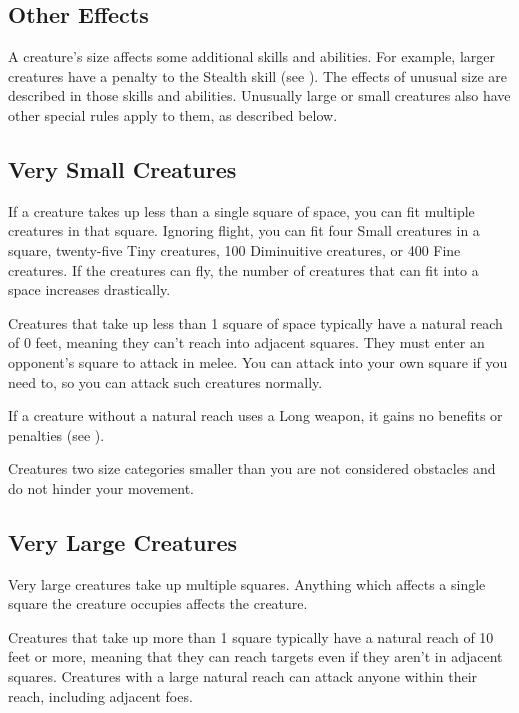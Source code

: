     \subsection{Other Effects}
        A creature's size affects some additional skills and abilities.
        For example, larger creatures have a penalty to the Stealth skill (see ).
        The effects of unusual size are described in those skills and abilities.
        Unusually large or small creatures also have other special rules apply to them, as described below.

    \subsection{Very Small Creatures}
         If a creature takes up less than a single square of space, you can fit multiple creatures in that square.
        Ignoring flight, you can fit four Small creatures in a square, twenty-five Tiny creatures, 100 Diminuitive creatures, or 400 Fine creatures.
        If the creatures can fly, the number of creatures that can fit into a space increases drastically.

         Creatures that take up less than 1 square of space typically have a natural reach of 0 feet, meaning they can't reach into adjacent squares. They must enter an opponent's square to attack in melee. You can attack into your own square if you need to, so you can attack such creatures normally.

        If a creature without a natural reach uses a Long weapon, it gains no benefits or penalties (see ).

         Creatures two size categories smaller than you are not considered obstacles and do not hinder your movement.

    \subsection{Very Large Creatures}\label{Very Large Creatures}
         Very large creatures take up multiple squares. Anything which affects a single square the creature occupies affects the creature.

         Creatures that take up more than 1 square typically have a natural reach of 10 feet or more, meaning that they can reach targets even if they aren't in adjacent squares. Creatures with a large natural reach can attack anyone within their reach, including adjacent foes.

